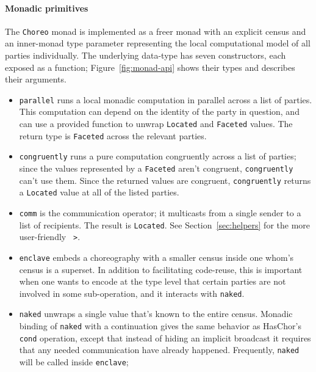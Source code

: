 \documentclass[sigplan,screen]{acmart}
\newcommand{\HasChor}{Has\-Chor\xspace}
\newcommand{\inlinecode}[2][haskell]{\texttt{#2}}
\begin{document}
\paragraph{Monadic primitives}
The \inlinecode{Choreo} monad is implemented as a freer monad with an explicit census
and an inner-monad type parameter representing
the local computational model of all parties individually.
The underlying data-type has seven constructors, each exposed as a function;
Figure~\ref{fig:monad-api} shows their types and describes their arguments.
\begin{itemize}[leftmargin=12pt, topsep=2pt]
    \item \inlinecode{parallel} runs a local monadic computation in parallel across a list of parties.
          This computation can depend on the identity of the party in question,
          and can use a provided function to unwrap \inlinecode{Located} and \inlinecode{Faceted}
          values.
          The return type is \inlinecode{Faceted} across the relevant parties.
    \item \inlinecode{congruently} runs a pure computation congruently across a list of parties;
          since the values represented by a \inlinecode{Faceted} aren't congruent,
          \inlinecode{congruently} can't use them.
          Since the returned values are congruent,
          \inlinecode{congruently} returns a \inlinecode{Located} value at all of the listed parties.
    \item \inlinecode{comm} is the communication operator;
          it multicasts from a single sender to a list of recipients.
          The result is \inlinecode{Located}.
          See Section~\ref{sec:helpers} for the more user-friendly \inlinecode{~>}.
    \item \inlinecode{enclave} embeds a choreography with a smaller census inside one whom's
          census is a superset.
          In addition to facilitating code-reuse, this is important when one wants to encode
          at the type level that certain parties are not involved in some sub-operation,
          and it interacts with \inlinecode{naked}.
    \item \inlinecode{naked} unwraps a single value that's known to the entire census.
          Monadic binding of \inlinecode{naked} with a continuation gives the same behavior
          as \HasChor's \inlinecode{cond} operation, except that instead of hiding an implicit
          broadcast it requires that any needed communication have already happened.
          Frequently, \inlinecode{naked} will be called inside \inlinecode{enclave};

\end{itemize}
\end{document}
